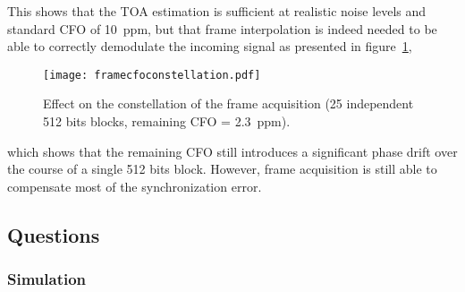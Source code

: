 This shows that the TOA estimation is sufficient at realistic noise levels and standard CFO of \SI{10}{ppm}, but that frame interpolation is indeed needed to be able to correctly demodulate the incoming signal as presented in figure~\ref{fig:framecfoconst},
\begin{figure}
  \centering
  \texttt{[image: framecfoconstellation.pdf]}
  \caption[Effect on the constellation of the frame acquisition]{Effect on the constellation of the frame acquisition (25 independent 512 bits blocks, remaining CFO = \SI{2.3}{ppm}).\label{fig:framecfoconst}}
\end{figure}
which shows that the remaining CFO still introduces a significant phase drift over the course of a single 512 bits block. However, frame acquisition is still able to compensate most of the synchronization error.


\subsection{Questions}
\subsubsection{Simulation}

